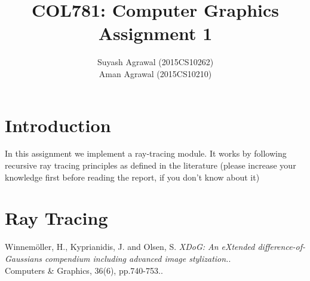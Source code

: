 \documentclass[12pt,a4paper]{article}
\title{COL781: Computer Graphics\\Assignment 1}
\author{Suyash Agrawal (2015CS10262)\\Aman Agrawal (2015CS10210)}
\begin{document}
\maketitle
\section{Introduction}
    In this assignment we implement a ray-tracing module. It works by following recursive ray tracing principles as defined in the literature (please increase your knowledge first before reading the report, if you don't know about it)


\section{Ray Tracing}


    \begin{thebibliography}{1}
        Winnemöller, H., Kyprianidis, J. and Olsen, S. 
        \textit{XDoG: An eXtended difference-of-Gaussians compendium including advanced image stylization.}.\\ 
        Computers \& Graphics, 36(6), pp.740-753..     
    \end{thebibliography}
\end{document}
